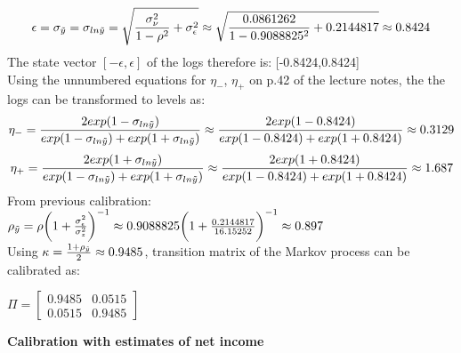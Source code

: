 \documentclass[12pt,a4paper]{article}
\begin{document}
\begin{equation*}
    \epsilon=\sigma_{\Tilde{y}}=\sigma_{ln \Tilde{y}}=\sqrt{\frac{\sigma^2_\nu}{1-\rho^2} +\sigma^2_\epsilon}\approx \sqrt{\frac{0.0861262}{1-0.9088825^2} +0.2144817}\approx 0.8424
\end{equation*}
The state vector $[-\epsilon,\epsilon]$ of the logs therefore is: [-0.8424,0.8424]\\
Using the unnumbered equations for $\eta_-$, $\eta_+$ on p.42 of the lecture notes, the the logs can be transformed to levels as:
\begin{equation*}
    \eta_-=\frac{2exp(1-\sigma_{ln\Tilde{y}})}{exp(1-\sigma_{ln\Tilde{y}})+exp(1+\sigma_{ln\Tilde{y}})}\approx\frac{2exp(1-0.8424)}{exp(1-0.8424)+exp(1+0.8424)}\approx0.3129
    \end{equation*}
    \begin{equation*}
       \eta_+=\frac{2exp(1+\sigma_{ln\Tilde{y}})}{exp(1-\sigma_{ln\Tilde{y}})+exp(1+\sigma_{ln\Tilde{y}})}\approx\frac{2exp(1+0.8424)}{exp(1-0.8424)+exp(1+0.8424)}\approx 1.687
    \end{equation*}
From previous calibration: $\rho_{\Tilde{y}}=\rho\bigg(1+\frac{\sigma^2_\epsilon}{\sigma^2_z}\bigg)^{-1}\approx0.9088825\bigg(1+\frac{0.2144817}{16.15252}\bigg)^{-1}\approx 0.897 $\\
Using $\kappa=\frac{1+\rho_{\Tilde{y}}}{2}\approx 0.9485$, transition matrix of the Markov process can be calibrated as:\\
\begin{center}
$\Pi = \begin{bmatrix}
0.9485 & 0.0515 \\
0.0515 & 0.9485
\end{bmatrix} $
\end{center}

\textbf{Calibration with estimates of net income}\\
\end{document}
